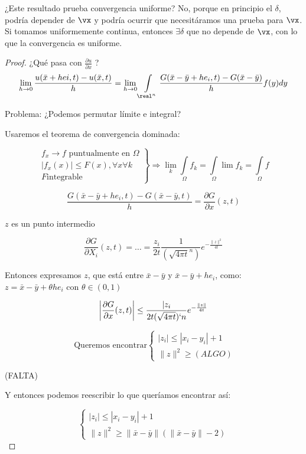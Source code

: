 		¿Este resultado prueba convergencia uniforme? No, porque en principio el $δ$, podría depender de $\vx$ y podría ocurrir que necesitáramos una prueba para $\vx$.
		Si tomamos uniformemente continua, entonces $\exists δ$ que no depende de $\vx$, con lo que la convergencia es uniforme.


		\begin{proof}
			¿Qué pasa con $\frac{\partial u}{\partial x}$ ?
			\[ \lim_{h \to 0} \frac{u(\bar{x} + hei,t)-u(\bar{x},t)}{h} = \lim_{h \to 0} \int\limits_{\real^n} \frac{G(\bar{x}-\bar{y}+he_i,t)-G(\bar{x}-\bar{y})}{h} f(y) dy
			\]

			Problema: ¿Podemos permutar límite e integral?

			Usaremos el teorema de convergencia dominada:

			\[\left. \begin{array}{r}
				f_x \to f \text{ puntualmente en } \Omega \\
				|f_x(x)| \leq F(x), \forall x \forall k \\
				F \text{integrable}
			\end{array} \right\} \Rightarrow \lim_k \int\limits_{\Omega} f_k = \int\limits_\Omega \lim f_k = \int\limits_\Omega f\]

			\[ \frac{G(\bar{x}-\bar{y}+he_i,t)-G(\bar{x}-\bar{y},t)}{h} = \frac{\partial G}{\partial x}(z,t) \]

			$z$ es un punto intermedio

			\[\frac{\partial G}{\partial X_i}(z,t) = … = \frac{z_i}{2t} \frac{1}{(\sqrt{4\pi t}^n)} e^{-\frac{\|z\|^2}{4t}}\]

			Entonces expresamos $z$, que está entre $\bar{x}-\bar{y}$ y $\bar{x}-\bar{y}+he_i$, como: $z = \bar{x} - \bar{y} + \theta h e_i$ con $\theta \in (0,1)$

			\[ \left| \frac{\partial G}{\partial x}(z,t) \right|  \leq \frac{|z_i}{2t (\sqrt{4\pi t})`n} e^{-\frac{\|z\|}{4t}}\]

			\[\text{ Queremos encontrar} \begin{cases}
				|z_i| \leq |x_i - y_i| + 1 \\
				\| z\|^2 \geq (ALGO)
			\end{cases}\]

			(FALTA)

			Y entonces podemos reescribir lo que queríamos encontrar así:

			\[\begin{cases}
				|z_i| \leq |x_i - y_i| + 1 \\
				\| z\|^2 \geq \|\bar{x}-\bar{y}\| (\|\bar{x}-\bar{y}\| -2)
			\end{cases}\]


\end{proof}
